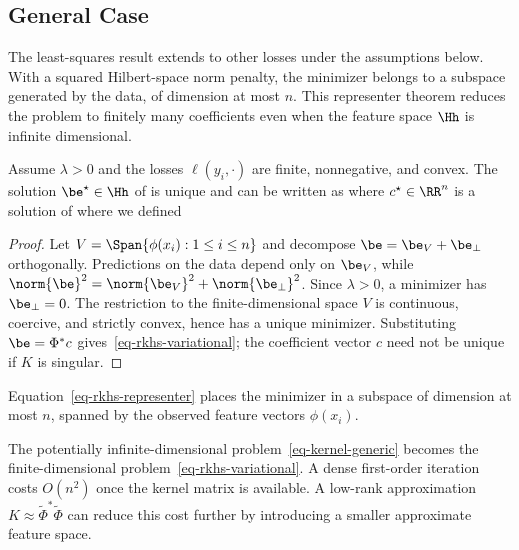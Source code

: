                                                   
\subsection{General Case}

The least-squares result extends to other losses under the assumptions below. With a squared Hilbert-space norm penalty, the minimizer belongs to a subspace generated by the data, of dimension at most $n$. This representer theorem reduces the problem to finitely many coefficients even when the feature space $\Hh$ is infinite dimensional.

\begin{prop}
	Assume $\lambda>0$ and the losses $\ell(y_i,\cdot)$ are finite, nonnegative, and convex. The solution $\be^\star\in\Hh$ of
	is unique and can be written as
	where $c^\star\in\RR^n$ is a solution of
	where we defined 
\end{prop}

\begin{proof}
Let $V=\Span\{\phi(x_i):1\leq i\leq n\}$ and decompose $\be=\be_V+\be_\perp$ orthogonally. Predictions on the data depend only on $\be_V$, while
$\norm{\be}^2=\norm{\be_V}^2+\norm{\be_\perp}^2$. Since $\lambda>0$, a minimizer has $\be_\perp=0$. The restriction to the finite-dimensional space $V$ is continuous, coercive, and strictly convex, hence has a unique minimizer. Substituting $\be=\Phi^*c$ gives~\eqref{eq-rkhs-variational}; the coefficient vector $c$ need not be unique if $K$ is singular.
\end{proof} 

Equation~\eqref{eq-rkhs-representer} places the minimizer in a subspace of dimension at most $n$, spanned by the observed feature vectors $\phi(x_i)$.
 
The potentially infinite-dimensional problem~\eqref{eq-kernel-generic} becomes the finite-dimensional problem~\eqref{eq-rkhs-variational}. A dense first-order iteration costs $O(n^2)$ once the kernel matrix is available. A low-rank approximation $K \approx \tilde\Phi^* \tilde \Phi$ can reduce this cost further by introducing a smaller approximate feature space.

